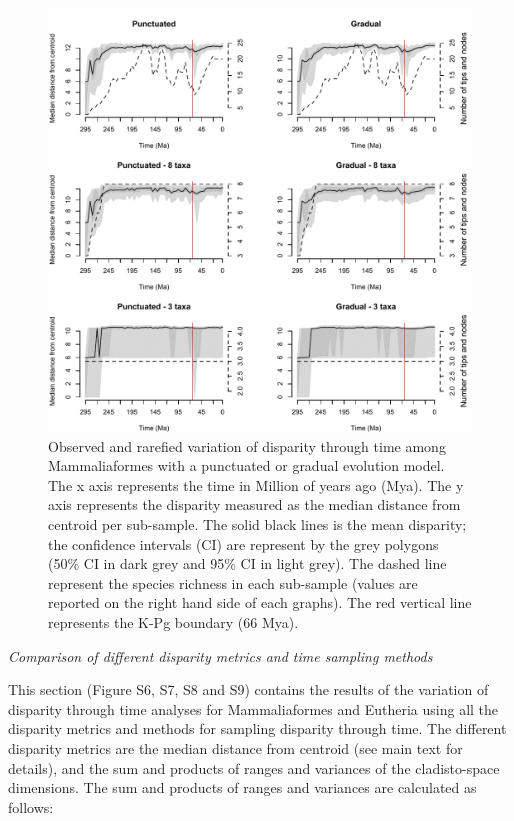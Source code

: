\documentclass[12pt,letterpaper]{article}
\renewcommand{\subsection}[1]{%
\bigskip
\begin{center}
\begin{large}
\normalfont\itshape #1
\end{large}
\end{center}}
\begin{document}
\begin{figure}[!h]
\centering
    \includegraphics[keepaspectratio=true]{Figures/Figure_S5.pdf}
\caption{\scriptsize{Observed and rarefied variation of disparity through time among Mammaliaformes with a punctuated or gradual evolution model. The x axis represents the time in Million of years ago (Mya). The y axis represents the disparity measured as the median distance from centroid per sub-sample. The solid black lines is the mean disparity; the confidence intervals (CI) are represent by the grey polygons (50\% CI in dark grey and 95\% CI in light grey). The dashed line represent the species richness in each sub-sample (values are reported on the right hand side of each graphs). The red vertical line represents the K-Pg boundary (66 Mya).}}
\end{figure}


\subsection{Comparison of different disparity metrics and time sampling methods}
This section (Figure S6, S7, S8 and S9) contains the results of the variation of disparity through time analyses for Mammaliaformes and Eutheria using all the disparity metrics and methods for sampling disparity through time.
The different disparity metrics are the median distance from centroid (see main text for details), and the sum and products of ranges and variances of the cladisto-space dimensions.
The sum and products of ranges and variances are calculated as follows:
\end{document}
